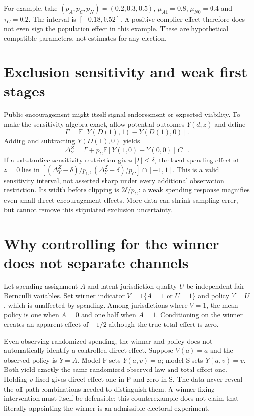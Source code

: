 \documentclass[11pt]{article}
\newcommand{\E}{\mathbb E}
\begin{document}
For example, take $(p_A,p_C,p_N)=(0.2,0.3,0.5)$, $\mu_{A1}=0.8$, $\mu_{N0}=0.4$ and $\tau_C=0.2$. The interval is $[-0.18,0.52]$. A positive complier effect therefore does not even sign the population effect in this example. These are hypothetical compatible parameters, not estimates for any election.

\section*{Exclusion sensitivity and weak first stages}
Public encouragement might itself signal endorsement or expected viability. To make the sensitivity algebra exact, allow potential outcomes $Y(d,z)$ and define
\[
 \Gamma=\E[Y(D(1),1)-Y(D(1),0)].
\]
Adding and subtracting $Y(D(1),0)$ yields
\[
 \Delta_Y^Z=\Gamma+p_C\E[Y(1,0)-Y(0,0)\mid C].
\]
If a substantive sensitivity restriction gives $|\Gamma|\leq\delta$, the local spending effect at $z=0$ lies in
$[(\Delta_Y^Z-\delta)/p_C,(\Delta_Y^Z+\delta)/p_C]\cap[-1,1]$.
This is a valid sensitivity interval, not asserted sharp under every additional observation restriction. Its width before clipping is $2\delta/p_C$: a weak spending response magnifies even small direct encouragement effects. More data can shrink sampling error, but cannot remove this stipulated exclusion uncertainty.

\section*{Why controlling for the winner does not separate channels}
Let spending assignment $A$ and latent jurisdiction quality $U$ be independent fair Bernoulli variables. Set winner indicator $V=1\{A=1\text{ or }U=1\}$ and policy $Y=U$, which is unaffected by spending. Among jurisdictions where $V=1$, the mean policy is one when $A=0$ and one half when $A=1$. Conditioning on the winner creates an apparent effect of $-1/2$ although the true total effect is zero.

Even observing randomized spending, the winner and policy does not automatically identify a controlled direct effect. Suppose $V(a)=a$ and the observed policy is $Y=A$. Model P sets $Y(a,v)=a$; model S sets $Y(a,v)=v$. Both yield exactly the same randomized observed law and total effect one. Holding $v$ fixed gives direct effect one in P and zero in S. The data never reveal the off-path combinations needed to distinguish them. A winner-fixing intervention must itself be defensible; this counterexample does not claim that literally appointing the winner is an admissible electoral experiment.
\end{document}
